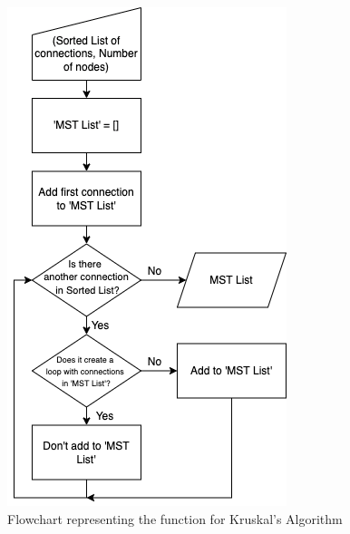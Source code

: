\documentclass[twocolumn]{article}
\begin{document}
\begin{figure}[H]
\centering
\includegraphics[width=0.65\columnwidth]{Figures/Flowchart 3.png}
\caption{Flowchart representing the function for Kruskal’s Algorithm}
\label{fig:flow3}
\end{figure}
\end{document}
